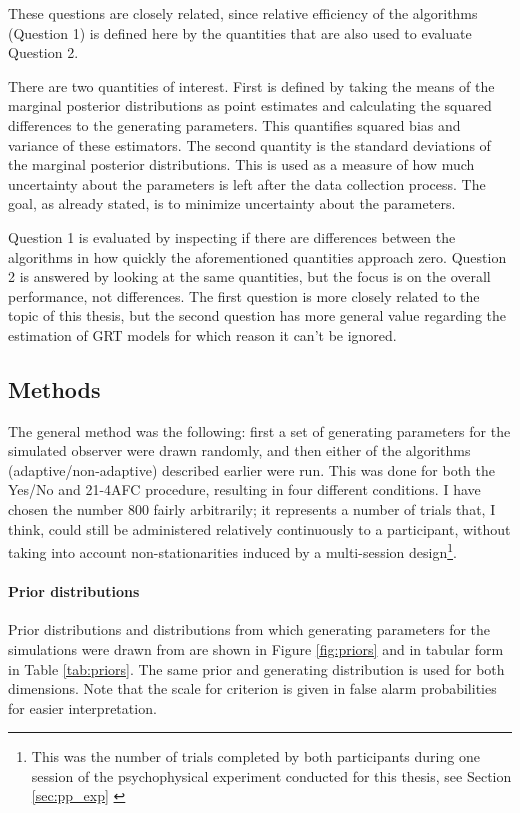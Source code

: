\documentclass{article}\usepackage{knitr}
\begin{document}
These questions are closely related, since relative efficiency of the algorithms (Question 1) is defined here by the quantities that are also used to evaluate Question 2. 

There are two quantities of interest. First is defined by taking the means of the marginal posterior distributions as point estimates and calculating the squared differences to the generating parameters. This quantifies squared bias and variance of these estimators. The second quantity is the standard deviations of the marginal posterior distributions. This is used as a measure of how much uncertainty about the parameters is left after the data collection process. The goal, as already stated, is to minimize uncertainty about the parameters.

Question 1 is evaluated by inspecting if there are differences between the algorithms in how quickly the aforementioned quantities approach zero. Question 2 is answered by looking at the same  quantities, but the focus is on the overall performance, not differences. The first question is more closely related to the topic of this thesis, but the second question has more general value regarding the estimation of GRT models for which reason it can't be ignored. 

\subsection{Methods}

The general method was the following: first a set of generating parameters for the simulated observer were drawn randomly, and then either of the algorithms (adaptive/non-adaptive) described earlier were run. This was done for both the Yes/No and 21-4AFC procedure, resulting in four different conditions. I have chosen the number 800 fairly arbitrarily; it represents a number of trials that, I think, could still be administered relatively continuously to a participant, without taking into account non-stationarities induced by a multi-session design\footnote{This was the number of trials completed by both participants during one session of the psychophysical experiment conducted for this thesis, see Section \ref{sec:pp_exp} \textit{}}. 

\paragraph{Prior distributions}

Prior distributions and distributions from which generating parameters for the simulations were drawn from are shown in Figure \ref{fig:priors} and in tabular form in Table \ref{tab:priors}. The same prior and generating distribution is used for both dimensions. Note that the scale for criterion is given in false alarm probabilities for easier interpretation. 
\end{document}
